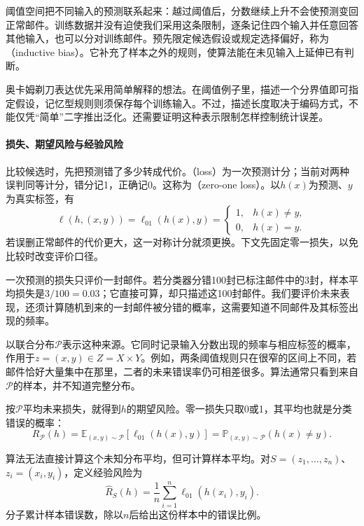 阈值空间把不同输入的预测联系起来：越过阈值后，分数继续上升不会使预测变回正常邮件。训练数据并没有迫使我们采用这条限制，逐条记住四个输入并任意回答其他输入，也可以分对训练邮件。预先限定候选假设或规定选择偏好，称为（inductive bias）。它补充了样本之外的规则，使算法能在未见输入上延伸已有判断。

奥卡姆剃刀表达优先采用简单解释的想法。在阈值例子里，描述一个分界值即可指定假设，记忆型规则则须保存每个训练输入。不过，描述长度取决于编码方式，不能仅凭“简单”二字推出泛化。还需要证明这种表示限制怎样控制统计误差。

\paragraph{损失、期望风险与经验风险}

比较候选时，先把预测错了多少转成代价。（loss）为一次预测计分；当前对两种误判同等计分，错分记1，正确记0。这称为（zero-one loss）。以$h(x)$为预测、$y$为真实标签，有
\begin{equation}
 \ell(h,(x,y))=\ell_{01}(h(x),y)=\begin{cases}
  1,&h(x)\neq y,\\
  0,&h(x)=y.
 \end{cases}
 \label{eq:zero-one-loss}
\end{equation}
若误删正常邮件的代价更大，这一对称计分就须更换。下文先固定零一损失，以免比较时改变评价口径。

一次预测的损失只评价一封邮件。若分类器分错100封已标注邮件中的3封，样本平均损失是$3/100=0.03$；它直接可算，却只描述这100封邮件。我们要评价未来表现，还须计算随机到来的一封邮件被分错的概率，这需要知道不同邮件及其标签出现的频率。

以联合分布$\mathcal P$表示这种来源。它同时记录输入分数出现的频率与相应标签的概率，作用于$z=(x,y)\in Z=X\times Y$。例如，两条阈值规则只在很窄的区间上不同，若邮件恰好大量集中在那里，二者的未来错误率仍可相差很多。算法通常只看到来自$\mathcal P$的样本，并不知道完整分布。

按$\mathcal P$平均未来损失，就得到$h$的期望风险。零一损失只取0或1，其平均也就是分类错误的概率：
\begin{equation}
 R_{\mathcal P}(h)
 =\mathbb E_{(x,y)\sim\mathcal P}[\ell_{01}(h(x),y)]
 =\mathbb P_{(x,y)\sim\mathcal P}(h(x)\neq y).
 \label{eq:population-classification-risk}
\end{equation}

算法无法直接计算这个未知分布平均，但可计算样本平均。对$S=(z_1,\ldots,z_n)$、$z_i=(x_i,y_i)$，定义经验风险为
\begin{equation}
 \hat R_S(h)=\frac1n\sum_{i=1}^n\ell_{01}(h(x_i),y_i).
 \label{eq:empirical-classification-risk}
\end{equation}
分子累计样本错误数，除以$n$后给出这份样本中的错误比例。

